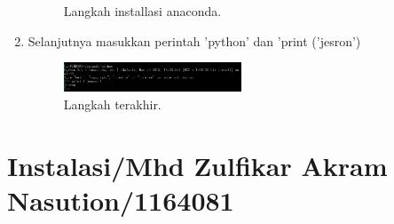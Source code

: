 \begin{enumerate}
\begin{figure}[ht]
\caption{Langkah installasi anaconda.}
\end{figure}
\item  Selanjutnya masukkan perintah 'python' dan 'print ('jesron')
\begin{figure}[ht]
\centerline{\includegraphics[width=0.5\textwidth]{figures/4.JPEG}}
\caption{Langkah terakhir.}
\end{figure}
\end{enumerate}

\section{Instalasi/Mhd Zulfikar Akram Nasution/1164081}
